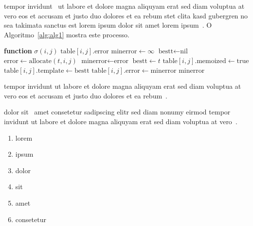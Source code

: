 tempor invidunt~\cite{SKIENAC698} ut labore et dolore magna
aliquyam erat sed diam voluptua at vero eos et accusam et justo
duo dolores et ea rebum stet clita kasd gubergren no sea takimata
sanctus est lorem ipsum dolor sit amet lorem
ipsum~\cite{NAGAPACKING07}. O Algoritmo~\ref{alg:alg1}
mostra este processo.

\begin{algorithm}[htb]
\begin{center}
    \begin{algorithmic}[1]
        \STATE \textbf{function} $\sigma\left(i,j\right)$
        \STATE {}
            \RETURN $\text{table}\left[i,j\right].\text{error}$
        \ENDIF
        \STATE $\text{minerror}\leftarrow\infty$
        \STATE $\text{bestt}\leftarrow{}\text{nil}$
            \STATE $\text{error}\leftarrow{}\text{allocate}\left(t,i,j\right)$
                \STATE $\text{minerror}\leftarrow{}\text{error}$
                \STATE $\text{bestt}\leftarrow{}t$
            \ENDIF
        \ENDFOR
        \STATE $\text{table}\left[i,j\right].\text{memoized}\leftarrow{}\text{true}$
        \STATE $\text{table}\left[i,j\right].\text{template}\leftarrow{}\text{bestt}$
        \STATE $\text{table}\left[i,j\right].\text{error}\leftarrow{}\text{minerror}$
        \RETURN $\text{minerror}$
    \end{algorithmic}
\end{center}
\caption[An algorithm with an optional, shorter caption]%
    {\label{alg:alg1}This is an algorithm with a very long
    caption. However, we replaced it with a shorter version
    in the Outline for legibility reasons}%
\end{algorithm}

tempor invidunt ut labore et dolore magna aliquyam erat sed diam
voluptua at vero eos et accusam et justo duo dolores et ea
rebum~\cite{CORMEMALGORITHMS01}.

dolor sit~\cite{BENTLEYBC07} amet consetetur sadipscing elitr sed
diam nonumy eirmod tempor invidunt ut labore et dolore magna
aliquyam erat sed diam voluptua at vero~\cite{BRIANPL04}.

\begin{enumerate}
   \item lorem
   \item ipsum
   \item dolor
   \item sit
   \item amet
   \item consetetur
\end{enumerate}

